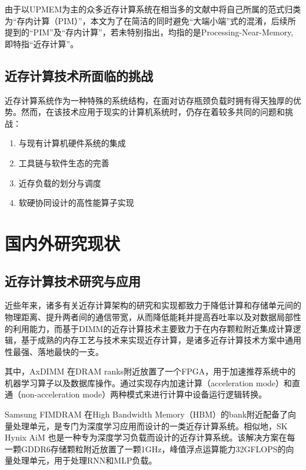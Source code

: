     由于以UPMEM为主的众多近存计算系统在相当多的文献中将自己所属的范式归类为“存内计算（PIM）”，本文为了在简洁的同时避免“大端小端”式的混淆，后续所提到的“PIM”及“存内计算”，若未特别指出，均指的是Processing-Near-Memory, 即特指“近存计算”。
    
    \subsection{近存计算技术所面临的挑战}\label{subsec:challenge_for_PNM}
    近存计算系统作为一种特殊的系统结构，在面对访存瓶颈负载时拥有得天独厚的优势。然而，在该技术应用于现实的计算机系统时，仍存在着较多共同的问题和挑战：
    \begin{enumerate}
        \item 与现有计算机硬件系统的集成
        \item 工具链与软件生态的完善
        \item 近存负载的划分与调度
        \item 软硬协同设计的高性能算子实现
    \end{enumerate}
\section{国内外研究现状}\label{sec:related_researches}
    \subsection{近存计算技术研究与应用}
     近些年来，诸多有关近存计算架构的研究和实现都致力于降低计算和存储单元间的物理距离、提升两者间的通信带宽\citep{devaux_true_2019,
     kwon_254_2021,
     ke_near-memory_2022,
     lee_hardware_2021,
     lee_1ynm_2022,
     niu_184qpsw_2022}，从而降低能耗并提高吞吐率以及对数据局部性的利用能力，而基于DIMM的近存计算技术主要致力于在内存颗粒附近集成计算逻辑，基于成熟的内存工艺与技术来实现近存计算，是诸多近存计算技术方案中通用性最强、落地最快的一支\citep{mutlu_modern_2022}。
    
    其中，AxDIMM\citep{ke_near-memory_2022} 在DRAM ranks附近放置了一个FPGA，用于加速推荐系统中的机器学习算子以及数据库操作\citep{lee_improving_2022}。通过实现存内加速计算（acceleration mode）和直通（non-acceleration mode）两种模式来进行计算中设备运行逻辑转换。
    
    Samsung FIMDRAM\citep{kwon_254_2021} 在High Bandwidth Memory（HBM）\citep{jun_hbm_2017}的bank附近配备了向量处理单元，是专门为深度学习应用而设计的一类近存计算系统。相似地，SK Hynix AiM\citep{lee_1ynm_2022} 也是一种专为深度学习负载而设计的近存计算系统。该解决方案在每一颗GDDR6存储颗粒附近放置了一颗1GHz，峰值浮点运算能力32GFLOPS的向量处理单元，用于处理RNN和MLP负载。
    
